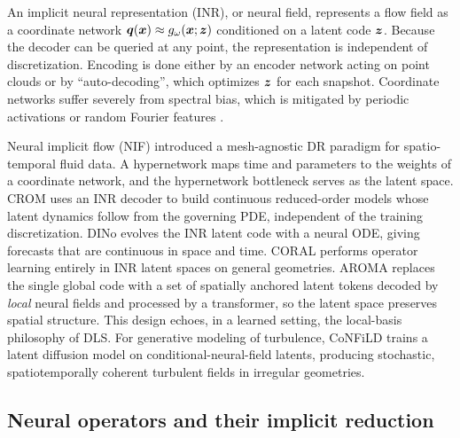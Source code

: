 An implicit neural representation (INR), or neural field, represents a flow
field as a coordinate network $\bm{q}(\bm{x})\approx g_{\omega}(\bm{x};\bm{z})$
conditioned on a latent code $\bm{z}$. Because the decoder can be queried at any
point, the representation is independent of discretization. Encoding is done
either by an encoder network acting on point clouds or by ``auto-decoding'',
which optimizes $\bm{z}$ for each snapshot. Coordinate networks suffer severely
from spectral bias, which is mitigated by periodic activations
\parencite{sitzmann2020siren} or random Fourier features \parencite{tancik2020fourier}.

Neural implicit flow (NIF) \parencite{pan2023nif} introduced a mesh-agnostic
DR paradigm for spatio-temporal fluid data. A hypernetwork maps time and
parameters to the weights of a coordinate network, and the hypernetwork
bottleneck serves as the latent space. CROM \parencite{chen2023crom} uses an
INR decoder to build continuous reduced-order models whose latent dynamics
follow from the governing PDE, independent of the training discretization.
DINo \parencite{yin2023dino} evolves the INR latent code with a neural ODE,
giving forecasts that are continuous in space and time. CORAL
\parencite{serrano2023coral} performs operator learning entirely in INR latent
spaces on general geometries. AROMA \parencite{serrano2024aroma} replaces the
single global code with a set of spatially anchored latent tokens decoded by
\emph{local} neural fields and processed by a transformer, so the latent space
preserves spatial structure. This design echoes, in a learned setting, the
local-basis philosophy of DLS. For generative modeling of turbulence,
CoNFiLD \parencite{du2024cnf} trains a latent diffusion model on
conditional-neural-field latents, producing stochastic, spatiotemporally
coherent turbulent fields in irregular geometries.

\subsection{Neural operators and their implicit reduction}

